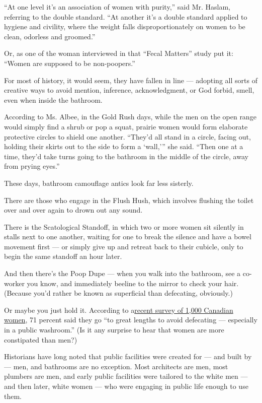 ``At one level it's an association of women with purity,'' said Mr.
Haslam, referring to the double standard. ``At another it's a double
standard applied to hygiene and civility, where the weight falls
disproportionately on women to be clean, odorless and groomed.''

Or, as one of the woman interviewed in that ``Fecal Matters'' study put
it: ``Women are supposed to be non-poopers.''

For most of history, it would seem, they have fallen in line ---
adopting all sorts of creative ways to avoid mention, inference,
acknowledgment, or God forbid, smell, even when inside the bathroom.

According to Ms. Albee, in the Gold Rush days, while the men on the open
range would simply find a shrub or pop a squat, prairie women would form
elaborate protective circles to shield one another. ``They'd all stand
in a circle, facing out, holding their skirts out to the side to form a
`wall,''' she said. ``Then one at a time, they'd take turns going to the
bathroom in the middle of the circle, away from prying eyes.''

These days, bathroom camouflage antics look far less sisterly.

There are those who engage in the Flush Hush, which involves flushing
the toilet over and over again to drown out any sound.

There is the Scatological Standoff, in which two or more women sit
silently in stalls next to one another, waiting for one to break the
silence and have a bowel movement first --- or simply give up and
retreat back to their cubicle, only to begin the same standoff an hour
later.

And then there's the Poop Dupe --- when you walk into the bathroom, see
a co-worker you know, and immediately beeline to the mirror to check
your hair. (Because you'd rather be known as superficial than
defecating, obviously.)

Or maybe you just hold it. According to
a\href{http://news.nationalpost.com/2013/04/30/is-pooping-the-last-taboo-for-women-at-work/}{recent
survey of 1,000 Canadian women}, 71 percent said they go ``to great
lengths to avoid defecating --- especially in a public washroom.'' (Is
it any surprise to hear that women are more constipated than men?)

Historians have long noted that public facilities were created for ---
and built by --- men, and bathrooms are no exception. Most architects
are men, most plumbers are men, and early public facilities were
tailored to the white men --- and then later, white women --- who were
engaging in public life enough to use them.

